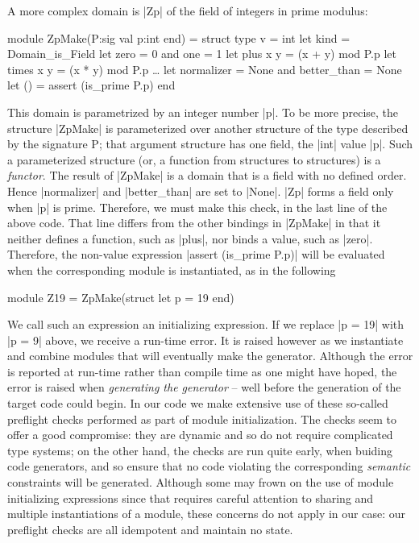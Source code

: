 \documentclass[draft]{elsart}
\begin{document}
A more complex domain is |Zp| of the field of integers in prime
modulus:
\begin{code}
module ZpMake(P:sig val p:int end) = struct
    type v = int
    let kind = Domain_is_Field
    let zero = 0 and one = 1
    let plus x y = (x + y) mod P.p
    let times x y = (x * y) mod P.p
    \dots
    let normalizer = None and better_than = None
    let () = assert (is_prime P.p)
end
\end{code}
This domain is parametrized by an integer number |p|. 
To be more precise, the structure |ZpMake| is
parameterized over another structure of the type described by
the signature P; that argument structure has one field, the |int| value |p|.
Such a parameterized structure (or, a function from structures to
structures) is a \emph{functor}. The result of |ZpMake| is a domain that is a
field with no defined order. Hence
|normalizer| and |better_than| are set to |None|. |Zp| forms
a field only when |p| is prime. Therefore, we must make this check,
in the last line of the above code. That line differs from the other 
bindings in |ZpMake| in that it neither defines a function, such as
|plus|, nor binds a value, such as |zero|. Therefore, the non-value
expression |assert (is_prime P.p)| will be evaluated
when the corresponding module is instantiated, as in the following
\begin{code}
module Z19 = ZpMake(struct let p = 19 end)
\end{code}
We call such an expression an initializing expression. If we
replace |p = 19| with |p = 9| above, we receive a run-time
error. It is raised however as we instantiate and combine modules that
will eventually make the generator.  Although the error is reported at
run-time rather than compile time as one might have hoped, the error
is raised when \emph{generating the generator} -- well before the
generation of the target code could begin. In our code we make
extensive use of these so-called preflight checks performed as part of
module initialization. The checks seem to offer a good compromise:
they are dynamic and so do not require complicated type systems; on
the other hand, the checks are run quite early, when buiding
code generators, and so ensure that no code violating the
corresponding \emph{semantic} constraints will be generated. Although
some may frown on the use of module initializing expressions since
that requires careful attention to sharing and multiple instantiations
of a module, these concerns do not apply in our case: our preflight
checks are all idempotent and maintain no state.
\end{document}
